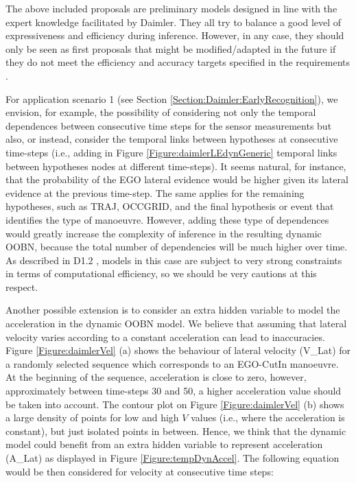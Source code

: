 The above included proposals are preliminary models designed in line with the expert knowledge facilitated by Daimler. They all try to balance a good level of expressiveness and efficiency during inference. However, in any case, they should only be seen as first proposals that might be modified/adapted in the future if they do not meet the efficiency and accuracy targets specified in the requirements \cite{Fer14}. 

For application scenario 1 (see Section \ref{Section:Daimler:EarlyRecognition}), we envision, for example, the possibility of considering not only the temporal dependences between consecutive time steps for the sensor measurements but also, or instead, consider the temporal links between hypotheses at consecutive time-steps (i.e., adding in Figure \ref{Figure:daimlerLEdynGeneric} temporal links between hypotheses nodes at different time-steps). It seems natural, for instance, that the probability of the EGO lateral evidence would be higher given its lateral evidence at the previous time-step. The same applies for the remaining hypotheses, such as TRAJ, OCCGRID, and the final hypothesis or event that identifies the type of manoeuvre. However, adding these type of dependences would greatly increase the complexity of inference in the resulting dynamic OOBN, because the total number of dependencies will be much higher over time. As described in D1.2 \cite{Fer14}, models in this case are subject to very strong constraints in terms of computational efficiency, so we should be very cautions at this respect. 

Another possible extension is to consider an extra hidden variable to model the acceleration in the dynamic OOBN model. We believe that assuming that lateral velocity varies according to a constant acceleration can lead to inaccuracies. Figure \ref{Figure:daimlerVel} (a) shows the behaviour of lateral velocity (V\_Lat) for a randomly selected sequence which corresponds to an EGO-CutIn manoeuvre. At the beginning of the sequence, acceleration is close to zero, however, approximately between time-steps 30 and 50, a higher acceleration value should be taken into account. The contour plot on Figure \ref{Figure:daimlerVel} (b) shows a large density of points for low and high $V$ values (i.e., where the acceleration is constant), but just isolated points in between. Hence, we think that the dynamic model could benefit from an extra hidden variable to represent acceleration (A\_Lat) as displayed in Figure \ref{Figure:tempDynAccel}. The following equation would be then considered for velocity at consecutive time steps:

